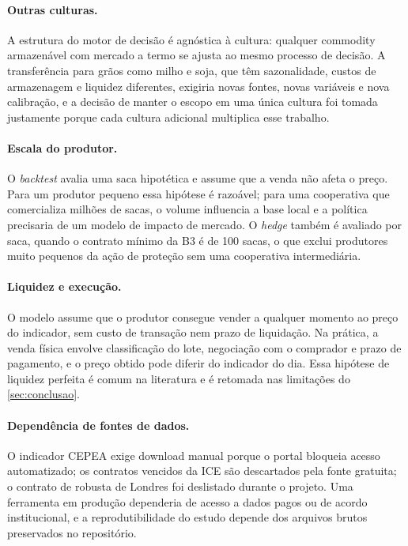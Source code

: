 \paragraph{Outras culturas.} A estrutura do motor de decisão é agnóstica à cultura: qualquer commodity armazenável com mercado a termo se ajusta ao mesmo processo de decisão. A transferência para grãos como milho e soja, que têm sazonalidade, custos de armazenagem e liquidez diferentes, exigiria novas fontes, novas variáveis e nova calibração, e a decisão de manter o escopo em uma única cultura foi tomada justamente porque cada cultura adicional multiplica esse trabalho.

\paragraph{Escala do produtor.} O \textit{backtest} avalia uma saca hipotética e assume que a venda não afeta o preço. Para um produtor pequeno essa hipótese é razoável; para uma cooperativa que comercializa milhões de sacas, o volume influencia a base local e a política precisaria de um modelo de impacto de mercado. O \textit{hedge} também é avaliado por saca, quando o contrato mínimo da B3 é de 100 sacas, o que exclui produtores muito pequenos da ação de proteção sem uma cooperativa intermediária.

\paragraph{Liquidez e execução.} O modelo assume que o produtor consegue vender a qualquer momento ao preço do indicador, sem custo de transação nem prazo de liquidação. Na prática, a venda física envolve classificação do lote, negociação com o comprador e prazo de pagamento, e o preço obtido pode diferir do indicador do dia. Essa hipótese de liquidez perfeita é comum na literatura e é retomada nas limitações do \autoref{sec:conclusao}.

\paragraph{Dependência de fontes de dados.} O indicador CEPEA exige download manual porque o portal bloqueia acesso automatizado; os contratos vencidos da ICE são descartados pela fonte gratuita; o contrato de robusta de Londres foi deslistado durante o projeto. Uma ferramenta em produção dependeria de acesso a dados pagos ou de acordo institucional, e a reprodutibilidade do estudo depende dos arquivos brutos preservados no repositório.
